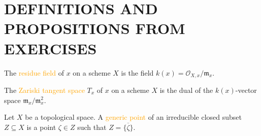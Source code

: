 \section*{DEFINITIONS AND PROPOSITIONS FROM EXERCISES}

\begin{definition}
	The \textcolor{orange}{residue field} of $x$ on a scheme $X$ is the field $k(x)=\mathcal{O}_{X,x}/\mathfrak{m}_x$.
\end{definition}

\begin{definition}
	The \textcolor{orange}{Zariski tangent space} $T_x$ of $x$ on a scheme $X$ is the dual of the $k(x)$-vector space $\mathfrak{m}_x/\mathfrak{m}_x^2$.
\end{definition}

\begin{definition}
	Let $X$ be a topological space. A \textcolor{orange}{generic point} of an irreducible closed subset $Z\subseteq X$ is a point $\zeta\in Z$ such that $Z=\overline{\{\zeta\}}$.
\end{definition}